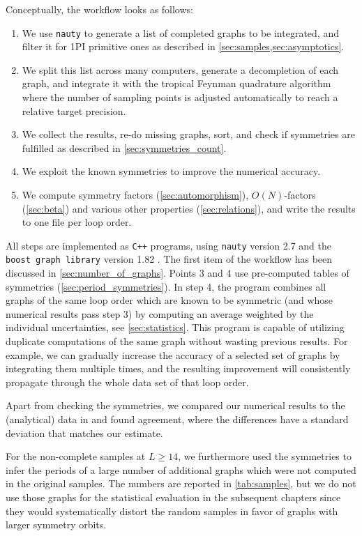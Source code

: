 \documentclass[12pt,a4paper]{article}
\renewcommand{\|}{\rule[-0.4ex]{0.2ex}{1.2em}}
\begin{document}
Conceptually, the workflow looks as follows:
\begin{enumerate}
	\item We use \texttt{nauty}  to generate a list of completed graphs to be integrated, and filter it for 1PI primitive ones as described in \cref{sec:samples,sec:asymptotics}.  
	\item We split this list across many computers, generate a decompletion of each graph, and integrate it with the tropical Feynman quadrature algorithm where  the number of sampling points is adjusted automatically to reach a relative target precision.
	\item We collect the results, re-do missing graphs, sort, and check if symmetries are fulfilled  as described in \cref{sec:symmetries_count}.
	\item We exploit the known symmetries to improve the numerical accuracy.
	\item We compute symmetry factors (\cref{sec:automorphism}), $O(N)$-factors (\cref{sec:beta}) and various other   properties (\cref{sec:relations}), and write the results to one file per loop order.
\end{enumerate}
All steps are implemented as \texttt{C++} programs, using \texttt{nauty} version 2.7 \cite{mckay_practical_2014} and the \texttt{boost graph library} version 1.82 \cite{siek_boost_2001}. The first item of the workflow has been discussed in \cref{sec:number_of_graphs}. Points 3 and 4 use pre-computed tables of symmetries (\cref{sec:period_symmetries}). In step 4, the program combines all graphs of the same loop order which are known to be symmetric (and whose numerical results pass step 3) by computing an average weighted by the individual uncertainties, see \cref{sec:statistics}. This program is capable of utilizing duplicate computations of the same graph  without wasting previous results. For example, we can gradually increase the accuracy of a selected set of graphs by integrating them multiple times, and the resulting improvement will consistently propagate through the whole data set of that loop order.


Apart from checking the symmetries, we compared our numerical results to the (analytical) data in \cite{panzer_galois_2017} and found agreement, where the differences have a standard deviation that matches our estimate. 

For the non-complete samples at $L \geq 14$, we furthermore used the symmetries to infer the periods of a large number of additional graphs which were not computed in the original samples. The numbers are reported in \cref{tab:samples}, but we do not use those graphs for the statistical evaluation in the subsequent chapters since they would systematically distort the random samples in favor of graphs with larger symmetry orbits. 
\end{document}
